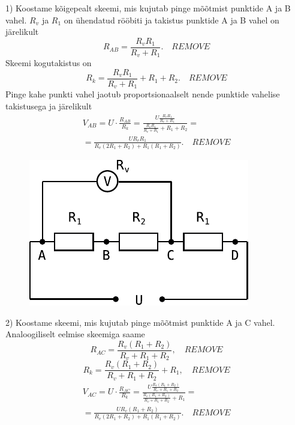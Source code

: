 \documentclass[10pt]{article}
\newcommand{\p}[1]{REMOVE}
\begin{document}
1) Koostame kõigepealt skeemi, mis kujutab pinge mõõtmist punktide A ja B vahel. $R_v$ ja $R_1$ on ühendatud rööbiti ja takistus punktide A ja B vahel on järelikult
\[
R_{AB}=\frac{R_v R_1}{R_v + R_1}. \quad \p{0,5}
\]
Skeemi kogutakistus on
\[
R_{k}=\frac{R_v R_1}{R_v + R_1} + R_1+R_2. \quad \p{0,5}
\]
Pinge kahe punkti vahel jaotub proportsionaalselt nende punktide vahelise takistusega ja järelikult
\begin{multline*}
V_{AB}=U\cdot\frac{R_{AB}}{R_k}=\frac{U\frac{R_v R_1}{R_v + R_1}}{\frac{R_v R_1}{R_v + R_1} + R_1+R_2}=\\
=\frac{UR_vR_1}{R_v(2R_1+R_2)+R_1(R_1+R_2)}. \quad \p{1}
\end{multline*}

\begin{figure}
\vspace{-1em}
  \begin{center}
    \includegraphics[width=1\linewidth]{2023-v2g-07-yl2.pdf}
  \end{center}
\end{figure}

2) Koostame skeemi, mis kujutab pinge mõõtmist punktide A ja C vahel. Analoogiliselt eelmise skeemiga saame
\[
R_{AC}=\frac{R_v (R_1+R_2)}{R_v + R_1+R_2}, \quad \p{0,5}
\]
\[
R_{k}=\frac{R_v (R_1+R_2)}{R_v + R_1+R_2}+R_1, \quad \p{0,5}
\]
\begin{multline*}
V_{AC}=U\cdot\frac{R_{AC}}{R_k}=\frac{U\frac{R_v (R_1+R_2)}{R_v + R_1+R_2}}{\frac{R_v (R_1+R_2)}{R_v + R_1+R_2}+R_1}=\\
=\frac{UR_v(R_1+R_2)}{R_v(2R_1+R_2)+R_1(R_1+R_2)}. \quad \p{1}
\end{multline*}
\end{document}
